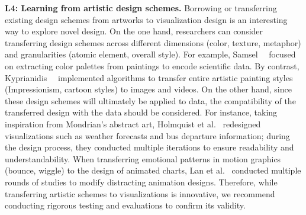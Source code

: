 \textbf{L4: Learning from artistic design schemes.} 
Borrowing or transferring existing design schemes from artworks to visualization design is an interesting way to explore novel design. 
On the one hand, researchers can consider transferring design schemes across different dimensions (\eg color, texture, metaphor) and granularities (\eg atomic element, overall style). For example, Samsel~\etal~\cite{samsel2018art} focused on extracting color palettes from paintings to encode scientific data. By contrast, Kyprianidis~\etal~\cite{kyprianidis2012state} implemented algorithms to transfer entire artistic painting styles (\eg Impressionism, cartoon styles) to images and videos.
On the other hand, since these design schemes will ultimately be applied to data, the compatibility of the transferred design with the data should be considered. For instance, taking inspiration from Mondrian's abstract art, Holmquist et al.~\cite{skog2003between,holmquist2003informative,redstrom2000informative} redesigned visualizations such as weather forecasts and bus departure information; during the design process, they conducted multiple iterations to ensure readability and understandability. 
When transferring emotional patterns in motion graphics (\eg bounce, wiggle) to the design of animated charts, Lan et al.~\cite{lan2021kineticharts} conducted multiple rounds of studies to modify distracting animation designs. 
Therefore, while transferring artistic schemes to visualizations is innovative, we recommend conducting rigorous testing and evaluations to confirm its validity.


